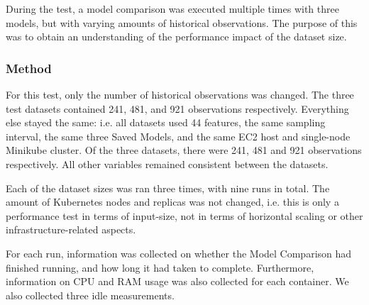 During the test, a model comparison was executed multiple times with three models, but with varying amounts of historical observations. The purpose of this was to obtain an understanding of the performance impact of the dataset size.

\subsubsection{Method}





For this test, only the number of historical observations was changed. The three test datasets contained 241, 481, and 921 observations respectively. Everything else stayed the same: i.e. all datasets used 44 features, the same sampling interval, the same three Saved Models, and the same EC2 host and single-node Minikube cluster. Of the three datasets, there were 241, 481 and 921 observations respectively. All other variables remained consistent between the datasets.

Each of the dataset sizes was ran three times, with nine runs in total. The amount of Kubernetes nodes and replicas was not changed, i.e. this is only a performance test in terms of input-size, not in terms of horizontal scaling or other infrastructure-related aspects.

For each run, information was collected on whether the Model Comparison had finished running, and how long it had taken to complete. Furthermore, information on CPU and RAM usage was also collected for each container. We also collected three idle measurements.

